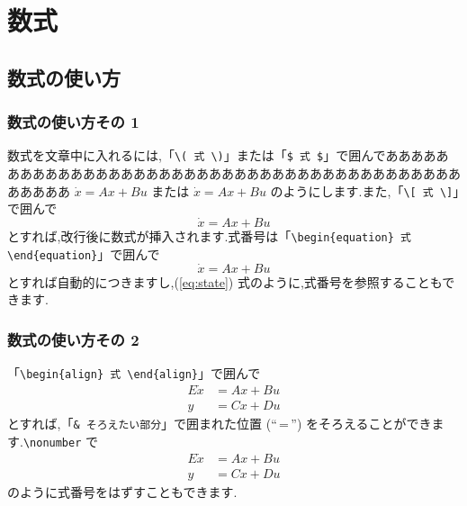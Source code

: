 
\section{数式}
\subsection{数式の使い方}
\subsubsection{数式の使い方その 1}
数式を文章中に入れるには,「{\verb+\( 式 \)+}」または「{\verb+$ 式 $+}」で囲んでああああああああああああああああああああああああああああああああああああああああああああああ
\(
\dot{x} = {A}{x} + {B}{u}
\) または $
  \dot{x} = Ax + Bu
$ のようにします.また,「{\verb+\[ 式 \]+}」で囲んで
\[
  \dot{x} = Ax + Bu
\]
とすれば,改行後に数式が挿入されます.式番号は「{\verb+\begin{equation} 式 \end{equation}+}」で囲んで
\begin{equation}
  \dot{x} = Ax + Bu
  \label{eq:state}
\end{equation}
とすれば自動的につきますし,(\ref{eq:state}) 式のように,式番号を参照することもできます.

\subsubsection{数式の使い方その 2}
「{\verb+\begin{align} 式 \end{align}+}」で囲んで
\begin{align}
  E\dot{x} & = Ax + Bu \\
  y        & = Cx + Du
\end{align}
とすれば,「{\verb+& そろえたい部分+}」で囲まれた位置 (``\,=\,'') をそろえることができます.{\verb+\nonumber+} で
\begin{align}
  E\dot{x} & = Ax + Bu           \\
  y        & = Cx + Du \nonumber
\end{align}
のように式番号をはずすこともできます.


